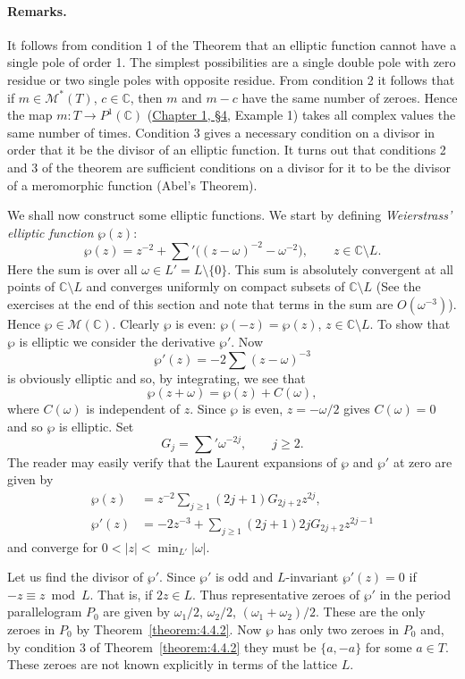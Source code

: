 \paragraph*{Remarks.} It follows from condition 1 of the Theorem that an elliptic function cannot have a single pole of order 1. The simplest possibilities are a single double pole with zero residue or two single poles with opposite residue. From condition 2 it follows that if $m\in\mathcal M^*(T)$, $c\in\mathbb C$, then $m$ and $m-c$ have the same number of zeroes. Hence the map $m:T\longrightarrow P^1(\mathbb C)$ (\hyperref[sec:1:4]{Chapter 1, \S4}, Example 1) takes all complex values the same number of times. Condition 3 gives a necessary condition on a divisor in order that it be the divisor of an elliptic function. It turns out that conditions 2 and 3 of the theorem are sufficient conditions on a divisor for it to be the divisor of a meromorphic function (Abel's Theorem).

We shall now construct some elliptic functions. We start by defining \emph{Weierstrass' elliptic function} $\wp(z)$:
\[
\wp(z)=z^{-2}+\sum{}'\big((z-\omega)^{-2}-\omega^{-2}\big),\qquad z\in\mathbb C\setminus L.
\]
Here the sum is over all $\omega\in L'=L\setminus\{0\}$. This sum is absolutely convergent at all points of $\mathbb C\setminus L$ and converges uniformly on compact subsets of $\mathbb C\setminus L$ (See the exercises at the end of this section and note that terms in the sum are $O(\omega^{-3})$). Hence $\wp\in\mathcal M(\mathbb C)$. Clearly $\wp$ is even: $\wp(-z)=\wp(z)$, $z\in\mathbb C\setminus L$. To show that $\wp$ is elliptic we consider the derivative $\wp'$. Now
\[
\wp'(z)=-2\sum(z-\omega)^{-3}
\]
is obviously elliptic and so, by integrating, we see that
\[
\wp(z+\omega)=\wp(z)+C(\omega),
\]
where $C(\omega)$ is independent of $z$. Since $\wp$ is even, $z=-\omega/2$ gives $C(\omega)=0$ and so $\wp$ is elliptic. Set
\[
G_j=\sum{}'\omega^{-2j},\qquad j\geq2.
\]
The reader may easily verify that the Laurent expansions of $\wp$ and $\wp'$ at zero are given by
\[
\begin{aligned}
\wp(z)&=z^{-2}\sum_{j\geq1}(2j+1)G_{2j+2}z^{2j},\\
\wp'(z)&=-2z^{-3}+\sum_{j\geq1}(2j+1)2jG_{2j+2}z^{2j-1}
\end{aligned}
\]
and converge for $0<|z|<\min_{L'}|\omega|$.

Let us find the divisor of $\wp'$. Since $\wp'$ is odd and $L$-invariant $\wp'(z)=0$ if $-z\equiv z\bmod L$. That is, if $2z\in L$. Thus representative zeroes of $\wp'$ in the period parallelogram $P_0$ are given by $\omega_1/2$, $\omega_2/2$, $(\omega_1+\omega_2)/2$. These are the only zeroes in $P_0$ by Theorem~\ref{theorem:4.4.2}. Now $\wp$ has only two zeroes in $P_0$ and, by condition 3 of Theorem~\ref{theorem:4.4.2} they must be $\{a,-a\}$ for some $a\in T$. These zeroes are not known explicitly in terms of the lattice $L$.


